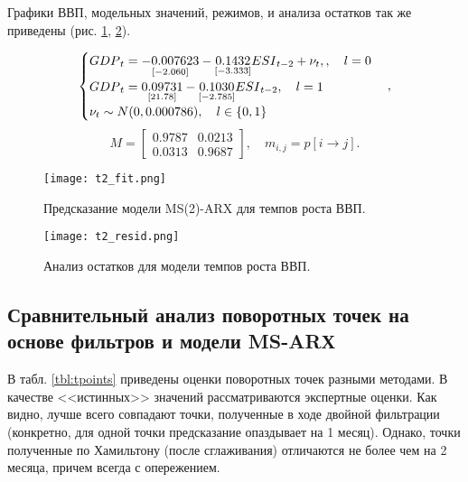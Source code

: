 \documentclass[a4paper,14pt]{extreport}
\begin{document}
	Графики ВВП, модельных значений, режимов, и анализа остатков так же приведены (рис. \ref{fig:hp-fitcompare2}, \ref{fig:hp-residcompare2}).
	
	
	{
		\begin{equation}
		\begin{cases}
		{GDP}_{t} = 
		\underset{[-2.060]}{-0.007623} 
		- \underset{[-3.333]}{0.1432} {ESI}_{t-2}
		+ \nu_{t} , \space 
		, \quad l=0 \\
		{GDP}_{t} = 
		\underset{[21.78]}{0.09731}
		- \underset{[-2.785]}{0.1030} {ESI}_{t-2}
		, \quad l=1 \\
		\nu_{t} \sim N(0, 0.000786) , \quad l \in \{0, 1\}
		\end{cases},
		\label{eq:ms2varx}
		\end{equation}
		\begin{equation}
		M = 
		\begin{bmatrix}
		0.9787 & 0.0213 \\
		0.0313 & 0.9687
		\end{bmatrix}
		, \quad m_{i,j} = p[i \rightarrow j]
		.
		\label{eq:ms2varx_m}
		\end{equation}		
	}
	
	{
		\begin{figure}
			\texttt{[image: t2\_fit.png]}
			\caption{Предсказание модели MS(2)-ARX для темпов роста ВВП.}
			\label{fig:hp-fitcompare2}
		\end{figure}
		\begin{figure}
			\texttt{[image: t2\_resid.png]}
			\caption{Анализ остатков для модели темпов роста ВВП.}
			\label{fig:hp-residcompare2}
		\end{figure}
	}
	
	
	
	\subsection{Сравнительный анализ поворотных точек на основе фильтров и модели MS-ARХ}
	
	
	В табл. \ref{tbl:tpoints} приведены оценки поворотных точек разными методами. В качестве <<истинных>> значений рассматриваются экспертные оценки. Как видно, лучше всего совпадают точки, полученные в ходе двойной фильтрации (конкретно, для одной точки предсказание опаздывает на 1 месяц). Однако, точки полученные по Хамильтону (после сглаживания) отличаются не более чем на 2 месяца, причем всегда с опережением.
	
\end{document}
